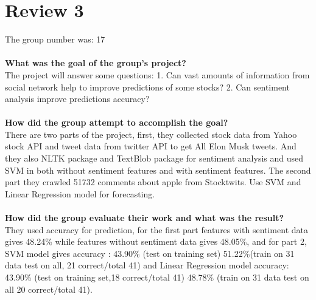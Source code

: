 \documentclass[paper=a4, fontsize=11pt]{scrartcl} %
\numberwithin{equation}{section} %
\numberwithin{figure}{section} %
\numberwithin{table}{section} %
\begin{document}
\section{Review 3}
{The group number was: 17} \\
\ \\
{\bf What was the goal of the group's project?} \\
The project will answer some questions: 1. Can vast amounts of information from social network help to improve
predictions of some stocks? 2. Can sentiment analysis improve predictions accuracy?\\
\ \\
{\bf How did the group attempt to accomplish the goal?}\\
There are two parts of the project, first, they collected stock data from Yahoo stock API and tweet data from twitter API to get All Elon Musk tweets. And 
they also NLTK package and TextBlob package for sentiment analysis and used SVM in both without sentiment features and with sentiment features. 
The second part they crawled 51732 comments about apple from Stocktwits. Use SVM and Linear Regression model  for forecasting.\\
\ \\
{\bf How did the group evaluate their work and what was the result?}\\
They used accuracy for prediction, for the first part features with sentiment data gives 48.24\% while features without sentiment data gives 48.05\%, and for part 2, SVM model gives  accuracy : 43.90\% (test on training set) 51.22\%(train on
31 data test on all, 21 correct/total 41) and  Linear Regression model accuracy: 43.90\% (test on training set,18
correct/total 41) 48.78\% (train on 31 data test on all 20 correct/total 41).
\end{document}
